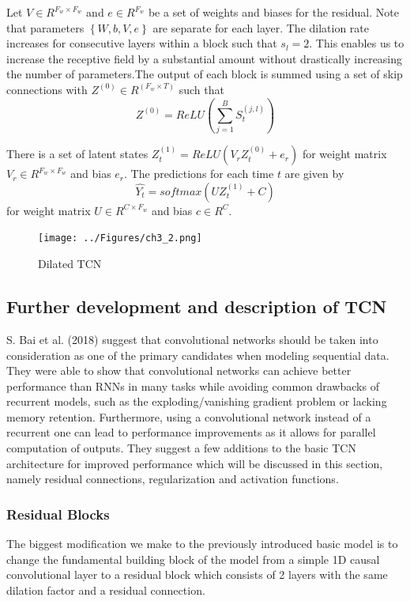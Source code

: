 Let $V \in R^{F_w \times F_w}$ and $e \in R^{F_w}$ be a set of weights and biases for the residual. Note that parameters $\left\{W,b,V,e\right\}$ are separate for each layer.
The dilation rate increases for consecutive layers within a block such that $s_l = 2$. This enables us to increase the receptive field by a substantial amount without drastically increasing the number of parameters.The output of each block is summed using a set of skip connections with $Z^{(0)} \in R^{(F_w \times T)}$ such that $$Z^{(0)} = ReLU(\sum_{j=1}^B S_t^{(j,l)})$$

There is a set of latent states $Z_t^{(1)} = ReLU(V_rZ_t^{(0)} + e_r)$ for weight matrix $V_r \in R^{F_w \times F_w}$ and bias $e_r$. The predictions for each time $t$ are given by $$\hat{Y_t} = softmax(UZ_t^{(1)}+C)$$ for weight matrix $U \in R^{C \times F_w}$ and bias $c \in R^C$.

\begin{figure}[H]
    \texttt{[image: ../Figures/ch3\_2.png]}
    \caption{Dilated TCN}
    \label{fig:dtcn}
\end{figure}

\subsection{Further development and description of TCN}
S. Bai et al. (2018) suggest that convolutional networks should be taken into consideration as one of the primary candidates when modeling sequential data. They were able to show that convolutional networks can achieve better performance than RNNs in many tasks while avoiding common drawbacks of recurrent models, such as the exploding/vanishing gradient problem or lacking memory retention. Furthermore, using a convolutional network instead of a recurrent one can lead to performance improvements as it allows for parallel computation of outputs. They suggest a few additions to the basic TCN architecture for improved performance which will be discussed in this section, namely residual connections, regularization and activation functions.

\subsubsection{Residual Blocks}
The biggest modification we make to the previously introduced basic model is to change the fundamental building block of the model from a simple 1D causal convolutional layer to a residual block which consists of 2 layers with the same dilation factor and a residual connection.

